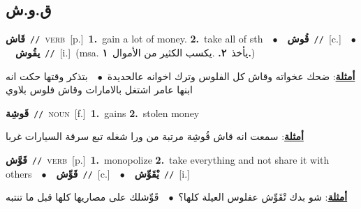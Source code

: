 \documentclass[10pt,a4paper,twoside]{article} %
\begin{document}
\begin{multicols}{2}
\vspace{-3mm}
\subsection*{\color{blue}\foreignlanguage{arabic}{ق.و.ش}\color{blue}{}} 

{\setlength\topsep{0pt}\textbf{\foreignlanguage{arabic}{قَاش}}\ {\color{gray}\texttt{//}\color{black}}\ \textsc{verb}\ [p.]\ \textbf{1.}~gain a lot of money.  \textbf{2.}~take all of sth\ \ $\bullet$\ \ \setlength\topsep{0pt}\textbf{\foreignlanguage{arabic}{قُوش}}\ {\color{gray}\texttt{//}\color{black}}\ [c.]\ \ $\bullet$\ \ \setlength\topsep{0pt}\textbf{\foreignlanguage{arabic}{يقُوش}}\ {\color{gray}\texttt{//}\color{black}}\ [i.]\ \color{gray}(msa. \foreignlanguage{arabic}{يأخذ}~\foreignlanguage{arabic}{\textbf{٢.}}  .\foreignlanguage{arabic}{يكسب الكثير من الأموال}~\foreignlanguage{arabic}{\textbf{١.}})\color{black}\  \begin{flushright}\color{gray}\foreignlanguage{arabic}{\textbf{\underline{\foreignlanguage{arabic}{أمثلة}}}: ضحك عخواته وقاش كل الفلوس وترك اخوانه عالحديدة\ $\bullet$\ \  بتذكر وقتها حكت انه ابنها عامر اشتغل بالامارات وقاش فلوس بلاوي}\end{flushright}\color{black}} \vspace{2mm}

{\setlength\topsep{0pt}\textbf{\foreignlanguage{arabic}{قَوشِة}}\ {\color{gray}\texttt{//}\color{black}}\ \textsc{noun}\ [f.]\ \textbf{1.}~gains  \textbf{2.}~stolen money\  \begin{flushright}\color{gray}\foreignlanguage{arabic}{\textbf{\underline{\foreignlanguage{arabic}{أمثلة}}}: سمعت انه قاش قُوشِة مرتبة من ورا شغله تبع سرقة السيارات غربا}\end{flushright}\color{black}} \vspace{2mm}

{\setlength\topsep{0pt}\textbf{\foreignlanguage{arabic}{قَوَّش}}\ {\color{gray}\texttt{//}\color{black}}\ \textsc{verb}\ [p.]\ \textbf{1.}~monopolize  \textbf{2.}~take everything and not share it with others\ \ $\bullet$\ \ \setlength\topsep{0pt}\textbf{\foreignlanguage{arabic}{قَوِّش}}\ {\color{gray}\texttt{//}\color{black}}\ [c.]\ \ $\bullet$\ \ \setlength\topsep{0pt}\textbf{\foreignlanguage{arabic}{يْقَوِّش}}\ {\color{gray}\texttt{//}\color{black}}\ [i.]\  \begin{flushright}\color{gray}\foreignlanguage{arabic}{\textbf{\underline{\foreignlanguage{arabic}{أمثلة}}}: شو بدك تْقَوِّش عفلوس العيلة كلها؟\ $\bullet$\ \  قَوِّشلك على مصاريها كلها قبل ما تنتبه}\end{flushright}\color{black}} \vspace{2mm}


\end{multicols}
\end{document}

